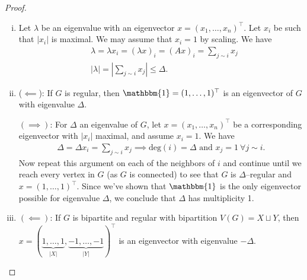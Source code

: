 \documentclass{article}
\theoremstyle{definition}
\begin{document}
\begin{proof}
    \begin{enumerate}[(i)]
        \item Let $\lambda$ be an eigenvalue with an eigenvector $x=(x_1,\ldots,x_n)^\top$. Let $x_i$ be such that $|x_i|$ is maximal. We may assume that $x_i=1$ by scaling. We have 
        \begin{align*}
            &\lambda = \lambda x_i = (\lambda x)_i = (Ax)_i = \sum_{j \sim i}^{} x_j\\
            &|\lambda|= |\sum_{j\sim i }^{} x_j| \le \Delta.
        \end{align*}
        \item ($\impliedby$): If $G$ is regular, then $\mathbbm{1}=(1,\ldots,1)^\top$ is an eigenvector of $G$ with eigenvalue $\Delta$.
        \vspace{1mm}
        
        $(\implies)$: For $\Delta$ an eigenvalue of $G$, let $x=(x_1,\ldots,x_n)^\top$ be a corresponding eigenvector with $|x_i|$ maximal, and assume $x_i=1$. We have
        \begin{align*}
            \Delta = \Delta x_i = \sum_{j \sim i }^{} x_j \implies \text{deg}(i)=\Delta \text{ and } x_j=1 ~\forall j \sim i.
        \end{align*}
        Now repeat this argument on each of the neighbors of $i$ and continue until we reach every vertex in $G$ (as $G$ is connected) to see that $G$ is $\Delta$--regular and $x=(1,\ldots,1)^\top$. Since we've shown that $\mathbbm{1}$ is the only eigenvector possible for eigenvalue $\Delta$, we conclude that $\Delta$ has multiplicity 1.
        \item $(\impliedby)$: If $G$ is bipartite and regular with bipartition $V(G) = X \sqcup Y$, then $x = (\underbrace{1,\ldots,1}_{|X|}, \underbrace{-1,\ldots,-1}_{|Y|})^\top$ is an eigenvector with eigenvalue $-\Delta$.
        \vspace{1mm}
        

\end{enumerate}
\end{proof}
\end{document}
